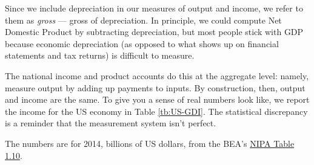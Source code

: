 Since we include depreciation in our measures of output and income,
we refer to them as \textit{gross} --- gross of depreciation.
In principle, we could compute Net Domestic Product
by subtracting depreciation, but most people stick with GDP because
economic depreciation (as opposed to what shows up on financial
statements and tax returns) is difficult to measure.


The national income and product accounts do this at the aggregate level:
namely, measure output by adding up payments to inputs.
By construction, then, output and income are the same.
To give you a sense of real numbers look like, we report
the income for the US economy  in Table \ref{tb:US-GDI}.
The statistical discrepancy is a reminder that the measurement
system isn't perfect.

\begin{table}[!ht]
\centering
\caption{Income components of US GDP.}
\label{tb:US-GDI}

\begin{minipage}{0.7\textwidth}
\footnotesize{%
\smallskip
The numbers are for 2014, billions of US dollars,
from the BEA's
\href{http://www.bea.gov/iTable/iTableHtml.cfm?reqid=9&step=3&isuri=1&903=51}{NIPA Table 1.10}.
}
\end{minipage}
\end{table}


